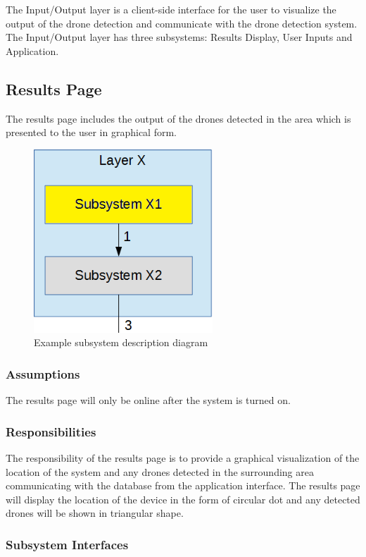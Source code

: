 The Input/Output layer is a client-side interface for the user to visualize the output of the drone detection and communicate with the drone detection system. The Input/Output layer has three subsystems: Results Display, User Inputs and Application.

\subsection{Results Page}
The results page includes the output of the drones detected in the area which is presented to the user in graphical form. 


\begin{figure}[h!]
	\centering
 	\includegraphics[width=0.60\textwidth]{images/subsystem}
 \caption{Example subsystem description diagram}
\end{figure}

\subsubsection{Assumptions}
The results page will only be online after the system is turned on.

\subsubsection{Responsibilities}
The responsibility of the results page is to provide a graphical visualization of the location of the system and any drones detected in the surrounding area communicating with the database from the application interface. The results page will display the location of the device in the form of circular dot and any detected drones will be shown in triangular shape.

\subsubsection{Subsystem Interfaces}

